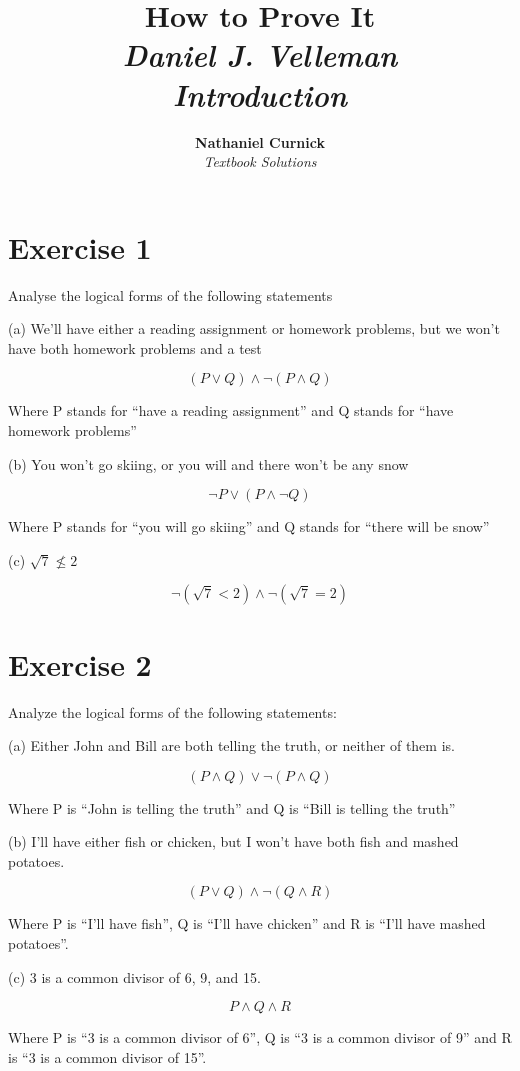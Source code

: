 \documentclass[11pt]{article}
\title{\textbf{How to Prove It} \\ {\Large\itshape Daniel J. Velleman} \\ {\Large\itshape Introduction}}
\author{\textbf{Nathaniel Curnick} \\ \textit{Textbook Solutions}}
\date{}
\begin{document}
\maketitle

\section*{Exercise 1}

Analyse the logical forms of the following statements

\noindent (a) We'll have either a reading assignment or homework problems, but we won't have both homework problems and a test

$$ (P \vee Q) \wedge \neg (P \wedge Q)$$

Where P stands for ``have a reading assignment'' and Q stands for ``have homework problems''

\noindent (b) You won't go skiing, or you will and there won't be any snow

$$\neg P \vee (P \wedge \neg Q)$$

Where P stands for ``you will go skiing'' and Q stands for ``there will be snow''

\noindent (c) $\sqrt{7} \nleq 2 $

$$\neg (\sqrt{7} < 2) \wedge \neg (\sqrt{7} = 2)$$

\section*{Exercise 2}

Analyze the logical forms of the following statements:

\noindent (a) Either John and Bill are both telling the truth, or neither of them is.

$$ (P \wedge Q) \vee \neg (P \wedge Q) $$

Where P is ``John is telling the truth'' and Q is ``Bill is telling the truth''

\noindent (b) I'll have either fish or chicken, but I won't have both fish and mashed potatoes.

$$ (P \vee Q ) \wedge \neg (Q \wedge R) $$

Where P is ``I'll have fish'', Q is ``I'll have chicken'' and R is ``I'll have mashed potatoes''.

\noindent (c) 3 is a common divisor of 6, 9, and 15.

$$ P \wedge Q \wedge R $$

Where P is ``3 is a common divisor of 6'', Q is ``3 is a common divisor of 9'' and R is ``3 is a common divisor of 15''.
\end{document}
